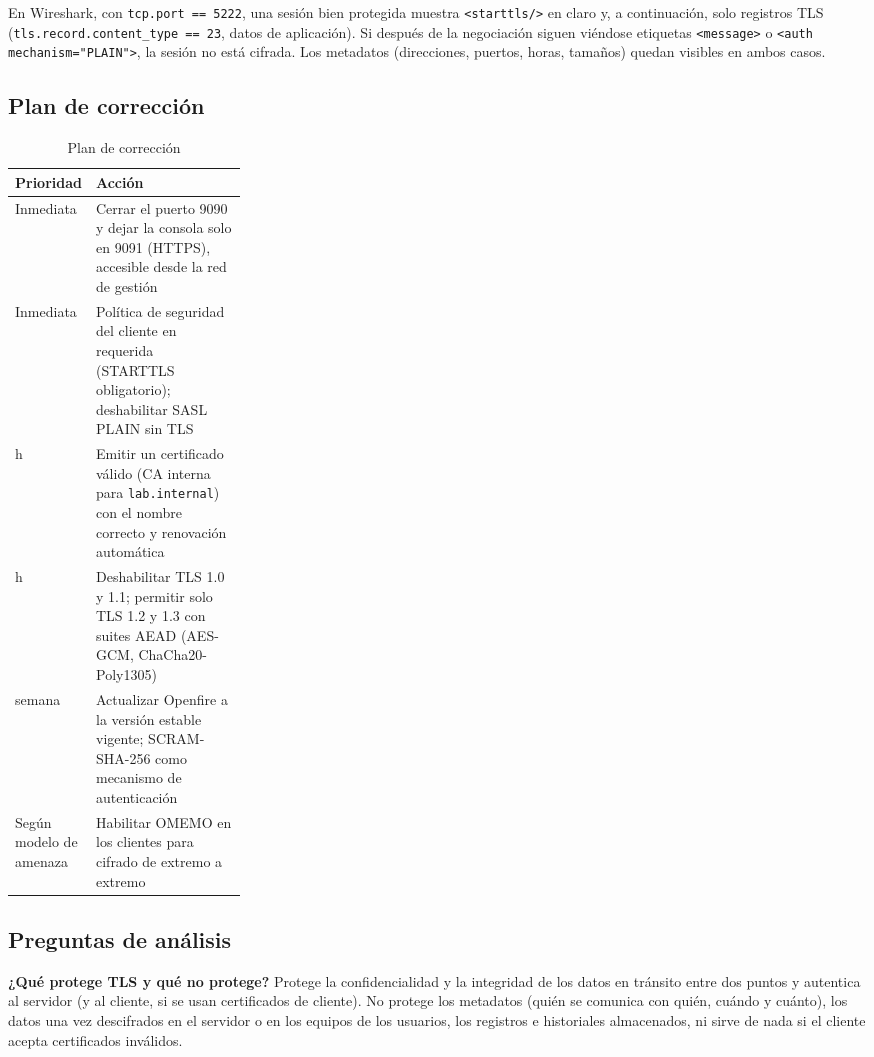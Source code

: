 En Wireshark, con \texttt{tcp.port == 5222}, una sesión bien protegida muestra \texttt{<starttls/>} en claro y, a continuación, solo registros TLS (\texttt{tls.record.content\_type == 23}, datos de aplicación). Si después de la negociación siguen viéndose etiquetas \texttt{<message>} o \texttt{<auth mechanism="PLAIN">}, la sesión no está cifrada. Los metadatos (direcciones, puertos, horas, tamaños) quedan visibles en ambos casos.

\subsection{Plan de corrección}

\begin{table}[H]
\centering
\small
\caption[Plan de corrección (tabla 1)]{Plan de corrección}
\begin{tabularx}{\linewidth}{>{\raggedright\arraybackslash}p{0.27\linewidth} >{\raggedright\arraybackslash}X}
\toprule
\textbf{Prioridad} & \textbf{Acción} \\
\midrule
Inmediata & Cerrar el puerto 9090 y dejar la consola solo en 9091 (HTTPS), accesible desde la red de gestión \\
Inmediata & Política de seguridad del cliente en \guillemotleft{}requerida\guillemotright{} (STARTTLS obligatorio); deshabilitar SASL PLAIN sin TLS \\
24 h & Emitir un certificado válido (CA interna para \texttt{lab.internal}) con el nombre correcto y renovación automática \\
24 h & Deshabilitar TLS 1.0 y 1.1; permitir solo TLS 1.2 y 1.3 con suites AEAD (AES-GCM, ChaCha20-Poly1305) \\
1 semana & Actualizar Openfire a la versión estable vigente; SCRAM-SHA-256 como mecanismo de autenticación \\
Según modelo de amenaza & Habilitar OMEMO en los clientes para cifrado de extremo a extremo \\
\bottomrule
\end{tabularx}
\end{table}

\subsection{Preguntas de análisis}

\textbf{¿Qué protege TLS y qué no protege?} Protege la confidencialidad y la integridad de los datos en tránsito entre dos puntos y autentica al servidor (y al cliente, si se usan certificados de cliente). No protege los metadatos (quién se comunica con quién, cuándo y cuánto), los datos una vez descifrados en el servidor o en los equipos de los usuarios, los registros e historiales almacenados, ni sirve de nada si el cliente acepta certificados inválidos.

